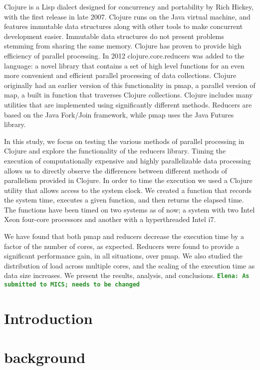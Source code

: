 \documentclass[12pt]{article}
\newcommand{\comment}[1]{{\bf \tt  {#1}}}
\newcommand{\emcomment}[1]{\textcolor{ForestGreen}{\comment{Elena: {#1}}}}
\begin{document}
Clojure is a Lisp dialect designed for concurrency and portability by Rich Hickey, with the first release in late 2007. Clojure runs on the Java virtual machine, and features immutable data structures along with other tools to make concurrent development easier. Immutable data structures do not present problems stemming from sharing the same memory. Clojure has proven to provide high efficiency of parallel processing. In 2012 clojure.core.reducers was added to the language: a novel library that contains a set of high level functions for an even more convenient and efficient parallel processing of data collections. Clojure originally had an earlier version of this functionality in pmap, a parallel version of map, a built in function that traverses Clojure collections. Clojure includes many utilities that are implemented using significantly different methods. Reducers are based on the Java Fork/Join framework, while pmap uses the Java Futures library.

In this study, we focus on testing the various methods of parallel processing in Clojure and explore the functionality of the reducers library. Timing the execution of computationally expensive and highly parallelizable data processing allows us to directly observe the differences between different methods of parallelism provided in Clojure. In order to time the execution we used a Clojure utility that allows access to the system clock. We created a function that records the system time, executes a given function, and then returns the elapsed time. The functions have been timed on two systems as of now; a system with two Intel Xeon four-core processors and another with a hyperthreaded Intel i7.

We have found that both pmap and reducers decrease the execution time by a factor of the number of cores, as expected. Reducers were found to provide a significant performance gain, in all situations, over pmap. We also studied the distribution of load across multiple cores, and the scaling of the execution time as data size increases. We present the results, analysis, and conclusions.
\emcomment{As submitted to MICS; needs to be changed}


\newpage
\setcounter{page}{1}

\section{Introduction}\label{sec:intro}

\section{background}\label{sec:background}
\end{document}
